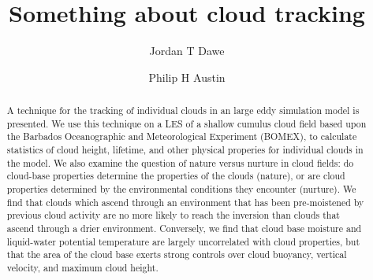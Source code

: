 \documentclass[acp]{copernicus}
\begin{document}
\title{Something about cloud tracking}


\author[1]{Jordan T Dawe}
\author[1]{Philip H Austin}










\received{}
\pubdiscuss{} %
\revised{}
\accepted{}
\published{}




\maketitle



\begin{abstract}
A technique for the tracking of individual clouds in an large eddy 
simulation model is presented.  We use this technique on a LES of a 
shallow cumulus cloud field based upon the Barbados Oceanographic and 
Meteorological Experiment (BOMEX), to calculate statistics of cloud 
height, lifetime, and other physical properies for individual clouds 
in the model.  We also examine the question of nature versus nurture 
in cloud fields: do cloud-base properties determine the properties 
of the clouds (nature), or are cloud properties determined by the 
environmental conditions they encounter (nurture).  We find that clouds 
which ascend through an environment that has been pre-moistened by 
previous cloud activity are no more likely to reach the inversion than 
clouds that ascend through a drier environment.  Conversely, we find 
that cloud base moisture and liquid-water potential temperature are 
largely uncorrelated with cloud properties, but that the area of the 
cloud base exerts strong controls over cloud buoyancy, vertical velocity, 
and maximum cloud height.
\end{abstract}
\end{document}
